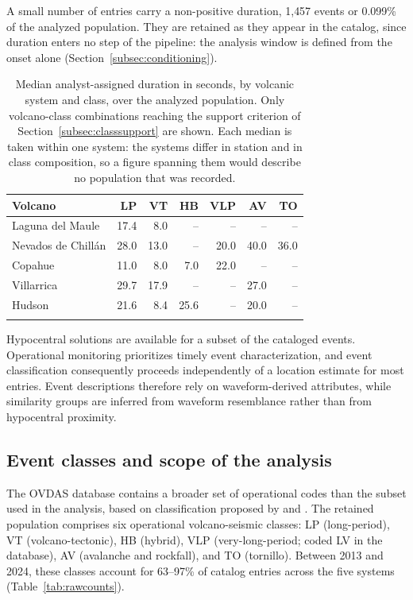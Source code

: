 \documentclass[pdflatex,sn-mathphys-num]{sn-jnl}
\begin{document}
A small number of entries carry a non-positive duration, 1{,}457 events or
0.099\% of the analyzed population. They are retained as they appear in the
catalog, since duration enters no step of the pipeline: the analysis window
is defined from the onset alone (Section~\ref{subsec:conditioning}).

\begin{table}[h]
\caption{Median analyst-assigned duration in seconds, by volcanic system and
class, over the analyzed population. Only volcano-class combinations reaching
the support criterion of Section~\ref{subsec:classsupport} are shown. Each
median is taken within one system: the systems differ in station and in class
composition, so a figure spanning them would describe no population that was
recorded.}\label{tab:durations}
\begin{tabular}{@{}lrrrrrr@{}}
\toprule
Volcano & LP & VT & HB & VLP & AV & TO \\
\midrule
Laguna del Maule      & 17.4 & 8.0  & --   & --   & --   & --   \\
Nevados de Chill\'an  & 28.0 & 13.0 & --   & 20.0 & 40.0 & 36.0 \\
Copahue               & 11.0 & 8.0  & 7.0  & 22.0 & --   & --   \\
Villarrica            & 29.7 & 17.9 & --   & --   & 27.0 & --   \\
Hudson                & 21.6 & 8.4  & 25.6 & --   & 20.0 & --   \\
\botrule
\end{tabular}
\end{table}

Hypocentral solutions are available for a subset of the cataloged events.
Operational monitoring prioritizes timely event characterization, and event
classification consequently proceeds independently of a location estimate for
most entries. Event descriptions therefore rely on waveform-derived attributes,
while similarity groups are inferred from waveform resemblance rather than
from hypocentral proximity.

\subsection{Event classes and scope of the analysis}\label{subsec:classes}

The OVDAS database contains a broader set of operational codes than the subset
used in the analysis, based on classification proposed by \cite{lahr_earthquake_1994} and \cite{chouet_volcano_2003}. The retained population comprises six operational volcano-seismic classes:
LP (long-period), VT (volcano-tectonic), HB (hybrid), VLP
(very-long-period; coded LV in the database), AV (avalanche and rockfall),
and TO (tornillo). Between 2013 and 2024, these classes account for 63--97\% of
catalog entries across the five systems (Table~\ref{tab:rawcounts}).
\end{document}
